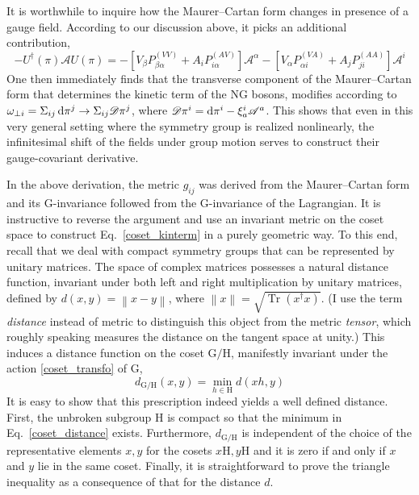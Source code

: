 \documentclass[final,3p,times,12pt,a4paper,sort&compress]{elsarticle}
\newcommand\gr[1]{\mathrm{#1}}              %
\newcommand\DD{\mathscr{D}}                 %
\newcommand\AAA{\mathscr{A}}                %
\newcommand\he[1]{#1^{\dagger}}             %
\newcommand\nor[1]{\left\|#1\right\|}       %
\newcommand\dd{\mathop{{\rm d}\!}\nolimits} %
\DeclareMathOperator{\Tr}{Tr}
\begin{document}
It is worthwhile to inquire how the Maurer--Cartan form changes in presence
of a gauge field. According to our discussion above, it picks an additional
contribution,
\begin{equation}
-\he U(\pi)\AAA U(\pi)= -\left[V_\beta
P^{(VV)}_{\beta\alpha}+A_iP^{(AV)}_{i\alpha}\right]\AAA^\alpha -\left[V_\alpha
P^{(VA)}_{\alpha i}+A_jP^{(AA)}_{ji}\right]\AAA^i
\label{gauged_Maurer}
\end{equation}
One then immediately finds that the transverse component of the Maurer--Cartan
form that determines the kinetic term of the NG bosons, modifies according to
$\omega_{\perp i}=\Sigma_{ij}\dd\pi^j\to\Sigma_{ij}\DD\pi^j$, where
$\DD\pi^i=\dd\pi^i-\xi^i_a\AAA^a$. This shows that even in this very general
setting where the symmetry group is realized nonlinearly, the infinitesimal
shift of the fields under group motion serves to construct their
gauge-covariant derivative.

In the above derivation, the metric $g_{ij}$ was derived from the
Maurer--Cartan form and its $\gr G$-invariance followed from the $\gr
G$-invariance of the Lagrangian. It is instructive to reverse the argument and
use an invariant metric on the coset space to construct
Eq.~\eqref{coset_kinterm} in a purely geometric way. To this end, recall that
we deal with compact symmetry groups that can be represented by unitary
matrices. The space of complex matrices possesses a natural distance function,
invariant under both left and right multiplication by unitary matrices, defined
by $d(x,y)=\nor{x-y}$, where $\nor x=\sqrt{\Tr(\he xx)}$. (I use the term
\emph{distance} instead of metric to distinguish this object from the metric
\emph{tensor}, which roughly speaking measures the distance on the tangent
space at unity.) This induces a distance function on the coset $\gr{G/H}$,
manifestly invariant under the action \eqref{coset_transfo} of $\gr G$,
\begin{equation}
d_{\gr{G/H}}(x,y)=\min_{h\in\gr H}d(xh,y)
\label{coset_distance}
\end{equation}
It is easy to show that this prescription indeed yields a well defined
distance. First, the unbroken subgroup $\gr H$ is compact so that the
minimum in Eq.~\eqref{coset_distance} exists. Furthermore, $d_{\gr{G/H}}$ is
independent of the choice of the representative elements $x,y$ for the cosets
$x\gr H,y\gr H$ and it is zero if and only if $x$ and $y$ lie in the same coset.
Finally, it is straightforward to prove the triangle inequality as a
consequence of that for the distance $d$.
\end{document}
